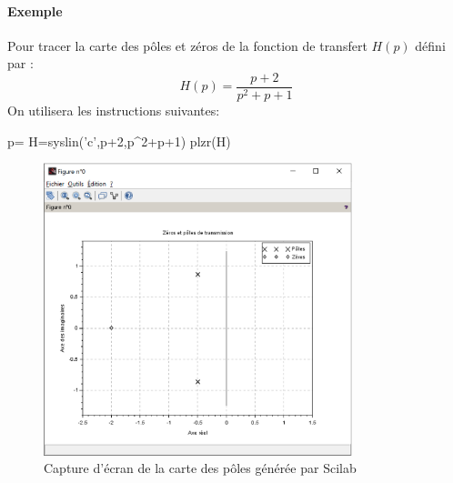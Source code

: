 \paragraph{Exemple}
Pour tracer la carte des pôles et zéros de la fonction de transfert $H(p)$ 
défini par :
\[
H(p)=\dfrac{p+2}{p^2+p+1}
\]
On utilisera les instructions suivantes:
\begin{Scilabcode}
p=%
H=syslin('c',p+2,p^2+p+1)
plzr(H)
\end{Scilabcode}
\begin{figure}[!b]
    \centering
    \includegraphics[width=0.8\textwidth]{fig/capture_SCILAB-plzr.eps}
    \caption{Capture d'écran de la carte des pôles générée par Scilab}
\end{figure}
\clearpage
